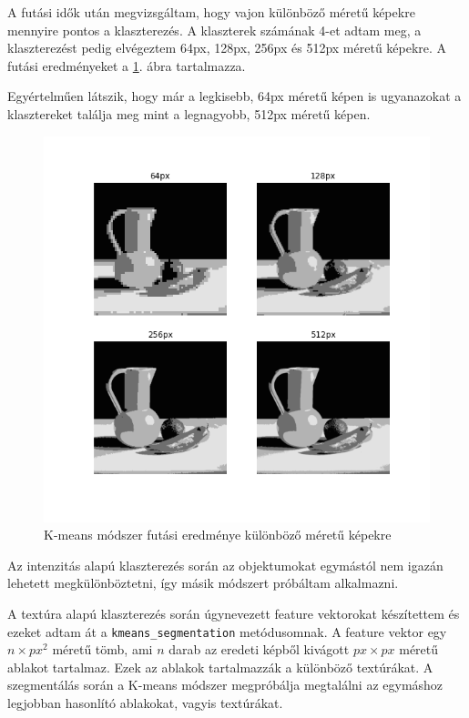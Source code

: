 A futási idők után megvizsgáltam, hogy vajon különböző méretű képekre mennyire pontos a klaszterezés. A klaszterek számának 4-et adtam meg, a klaszterezést pedig elvégeztem 64px, 128px, 256px és 512px méretű képekre. A futási eredményeket a \ref{fig:kmenas_picture_sizes}. ábra tartalmazza.

Egyértelműen látszik, hogy már a legkisebb, 64px méretű képen is ugyanazokat a klasztereket találja meg mint a legnagyobb, 512px méretű képen.

\begin{figure}[h]
\centering
\includegraphics[scale=0.7]{images/kmeans_picture_sizes.png}
\caption{K-means módszer futási eredménye különböző méretű képekre}
\label{fig:kmenas_picture_sizes}
\end{figure}

 \label{kmeans_texture}

Az intenzitás alapú klaszterezés során az objektumokat egymástól nem igazán lehetett megkülönböztetni, így másik módszert próbáltam alkalmazni.

A textúra alapú klaszterezés során úgynevezett feature vektorokat készítettem és ezeket adtam át a \texttt{kmeans\_segmentation} metódusomnak. A feature vektor egy $n\times px^2$ méretű tömb, ami $n$ darab az eredeti képből kivágott $px \times px$ méretű ablakot tartalmaz. Ezek az ablakok tartalmazzák a különböző textúrákat. A szegmentálás során a K-means módszer megpróbálja megtalálni az egymáshoz legjobban hasonlító ablakokat, vagyis textúrákat.

